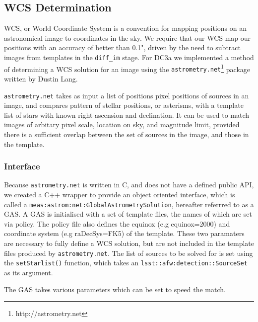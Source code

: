 
\subsection{WCS Determination}

WCS, or World Coordinate System is a convention for mapping positions on an astronomical image to coordinates in the sky. We require that our WCS map our positions with an accuracy of better than 0.1", driven by the need to subtract images from templates in the {\tt diff\_im} stage. For DC3a we implemented a method of determining a WCS solution for an image using the {\tt astrometry.net}\footnote{http://astrometry.net} package written by Dustin Lang. 

{\tt astrometry.net} takes as input a list of positions pixel positions of sources in an image, and compares pattern of stellar positions, or asterisms, with a template list of stars with known right ascension and declination. It can be used to match images of arbitary pixel scale, location on sky, and magnitude limit, provided there is a sufficient overlap between the set of sources in the image, and those in the template. 

\subsubsection{Interface}
Because {\tt astrometry.net} is written in C, and does not have a defined public API, we created a C++ wrapper to provide an object oriented interface, which is called a {\tt meas:astrom:net:GlobalAstrometrySolution}, hereafter referrred to as a GAS. A GAS is initialised with a set of template files, the names of which are set via policy. The policy file also defines the equinox (e.g equinox=2000) and coordinate system (e.g raDecSys=FK5) of the template. These two paramaters are necessary to fully define a WCS solution, but are not included in the template files produced by {\tt astrometry.net}. The list of sources to be solved for is set using the {\tt setStarlist()} function, which takes an {\tt lsst::afw:detection::SourceSet} as its argument.


The GAS takes various parameters which can be set to speed the match. 


